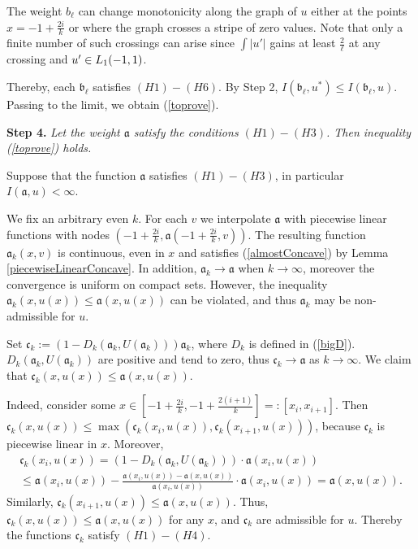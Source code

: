 The weight $b_{\ell}$ can change monotonicity along the graph of $u$
either at the points $x = -1 + \frac{2 i}{k}$ or where the graph crosses a stripe of zero values.
Note that only a finite number of such crossings can arise since
$\int |u'|$ gains at least $\frac{2}{\ell}$ at any crossing and $u' \in L_1(-1, 1)$.

Thereby, each $\mathfrak b_{\ell}$ satisfies $(H1)-(H6)$. By Step 2, $I(\mathfrak b_{\ell}, u^*) \le I(\mathfrak b_{\ell}, u)$.
Passing to the limit, we obtain (\ref{toprove}).

\bigskip
{\bf Step 4.} {\it Let the weight $\mathfrak a$ satisfy the conditions $(H1)-(H3)$.
Then inequality (\ref{toprove}) holds.}

Suppose that the function $\mathfrak a$ satisfies $(H1)-(H3)$, in particular $I(\mathfrak a, u) < \infty$.

We fix an arbitrary even $k$.
For each $v$ we interpolate $\mathfrak a$ with piecewise linear functions
with nodes $( -1 + \frac{2i}{k}, \mathfrak a(-1 + \frac{2i}{k}, v) )$.
The resulting function $\mathfrak a_k(x, v)$ is continuous, even in $x$
and satisfies (\ref{almostConcave}) by Lemma \ref{piecewiseLinearConcave}.
In addition, $\mathfrak a_k \to \mathfrak a$ when $k \to \infty$,
moreover the convergence is uniform on compact sets.
However, the inequality $\mathfrak a_k(x, u(x)) \le \mathfrak a(x, u(x))$ can be violated,
and thus $\mathfrak a_k$ may be non-admissible for $u$.

Set $\mathfrak c_k := (1 - D_k(\mathfrak a_k, U(\mathfrak a_k))) \mathfrak a_k$, where $D_k$ is defined in (\ref{bigD}).
$D_k(\mathfrak a_k, U(\mathfrak a_k))$ are positive and tend to zero, thus $\mathfrak c_k \to \mathfrak a$ as $k \to \infty$.
We claim that $\mathfrak c_k(x, u(x)) \le \mathfrak a(x, u(x))$.

Indeed, consider some
$x \in [-1 + \frac{2i}{k}, -1 + \frac{2(i + 1)}{k}] =: [x_i, x_{i + 1}]$.
Then $\mathfrak c_k(x, u(x)) \le \max( \mathfrak c_k(x_i, u(x)), \mathfrak c_k(x_{i + 1}, u(x)) )$, because
$\mathfrak c_k$ is piecewise linear in $x$. Moreover,
\begin{multline*}
\mathfrak c_k(x_i, u(x)) = ( 1 - D_k(\mathfrak a_k, U(\mathfrak a_k))) \cdot \mathfrak a(x_i, u(x)) \\
\le \mathfrak a(x_i, u(x)) - \frac{\mathfrak a(x_i, u(x)) - \mathfrak a(x, u(x))}{\mathfrak a(x_i, u(x))} \cdot \mathfrak a(x_i, u(x)) = \mathfrak a(x, u(x)).
\end{multline*}
Similarly, $\mathfrak c_k(x_{i + 1}, u(x)) \le \mathfrak a(x, u(x))$.
Thus, $\mathfrak c_k(x, u(x)) \le \mathfrak a(x, u(x))$ for any $x$, and $\mathfrak c_k$ are admissible for $u$.
Thereby the functions $\mathfrak c_k$ satisfy $(H1)-(H4)$.


